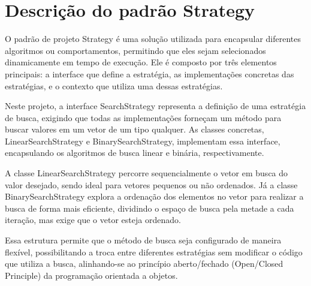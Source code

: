 \section{Descrição do padrão Strategy}

O padrão de projeto Strategy é uma solução utilizada para encapsular diferentes
algoritmos ou comportamentos, permitindo que eles sejam selecionados dinamicamente 
em tempo de execução. Ele é composto por três elementos principais: a interface que 
define a estratégia, as implementações concretas das estratégias, e o contexto que 
utiliza uma dessas estratégias.

Neste projeto, a interface SearchStrategy representa a definição de uma estratégia 
de busca, exigindo que todas as implementações forneçam um método para buscar 
valores em um vetor de um tipo qualquer. As classes concretas, LinearSearchStrategy 
e BinarySearchStrategy, implementam essa interface, encapsulando os algoritmos de 
busca linear e binária, respectivamente.

A classe LinearSearchStrategy percorre sequencialmente o vetor em busca 
do valor desejado, sendo ideal para vetores pequenos ou não ordenados. 
Já a classe BinarySearchStrategy explora a ordenação dos elementos no vetor 
para realizar a busca de forma mais eficiente, dividindo o espaço de busca 
pela metade a cada iteração, mas exige que o vetor esteja ordenado.

Essa estrutura permite que o método de busca seja configurado de maneira 
flexível, possibilitando a troca entre diferentes estratégias sem modificar 
o código que utiliza a busca, alinhando-se ao princípio aberto/fechado 
(Open/Closed Principle) da programação orientada a objetos.